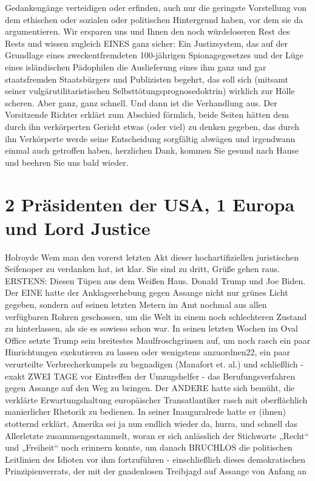 \begin{multicols}{2}
Gedankengänge verteidigen oder erfinden, auch nur
die geringste Vorstellung von dem ethischen oder sozialen oder politischen Hintergrund haben, vor dem sie da
argumentieren. Wir ersparen uns und Ihnen den noch
würdeloseren Rest des Rests und wissen zugleich EINES
ganz sicher: Ein Justizsystem, das auf der Grundlage eines zweckentfremdeten 100-jährigen Spionagegesetzes
und der Lüge eines isländischen Pädophilen die Auslieferung eines ihm ganz und gar staatsfremden Staatsbürgers und Publizisten begehrt, das soll sich (mitsamt
seiner vulgärutilitaristischen Selbsttötungsprognosedoktrin) wirklich zur Hölle scheren. Aber ganz, ganz
schnell.
Und dann ist die Verhandlung aus. Der Vorsitzende Richter erklärt zum Abschied förmlich, beide Seiten hätten
dem durch ihn verkörperten Gericht etwas (oder viel) zu
denken gegeben, das durch ihn Verkörperte werde seine
Entscheidung sorgfältig abwägen und irgendwann einmal auch getroffen haben, herzlichen Dank, kommen
Sie gesund nach Hause und beehren Sie uns bald wieder.



\chapter{2 Präsidenten der USA, 1 Europa und Lord Justice} %
Holroyde
Wem man den vorerst letzten Akt dieser hochartifiziellen juristischen Seifenoper zu verdanken hat, ist klar. Sie
sind zu dritt, Grüße gehen raus.
ERSTENS: Diesen Tüpen aus dem Weißen Haus. Donald
Trump und Joe Biden. Der EINE hatte der Anklageerhebung gegen Assange nicht nur grünes Licht gegeben,
sondern auf seinen letzten Metern im Amt nochmal aus
allen verfügbaren Rohren geschossen, um die Welt in einem noch schlechteren Zustand zu hinterlassen, als sie
es sowieso schon war. In seinen letzten Wochen im Oval
Office setzte Trump sein breitestes Maulfroschgrinsen
auf, um noch rasch ein paar Hinrichtungen exekutieren
zu lassen oder wenigstens anzuordnen22, ein paar verurteilte Verbrecherkumpels zu begnadigen (Manafort et.
al.) und schließlich - exakt ZWEI TAGE vor Eintreffen der
Umzugshelfer - das Berufungsverfahren gegen Assange
auf den Weg zu bringen.
Der ANDERE hatte sich bemüht, die verklärte Erwartungshaltung europäischer Transatlantiker rasch mit
oberflächlich manierlicher Rhetorik zu bedienen. In
seiner Inauguralrede hatte er (ihnen) stotternd erklärt,
Amerika sei ja nun endlich wieder da, hurra, und schnell
das Allerletzte zusammengestammelt, woran er sich anlässlich der Stichworte „Recht“ und „Freiheit“ noch erinnern konnte, um danach BRUCHLOS die politischen
Leitlinien des Idioten vor ihm fortzuführen - einschließlich dieses demokratischen Prinzipienverrats, der mit
der gnadenlosen Treibjagd auf Assange von Anfang an


\end{multicols}

